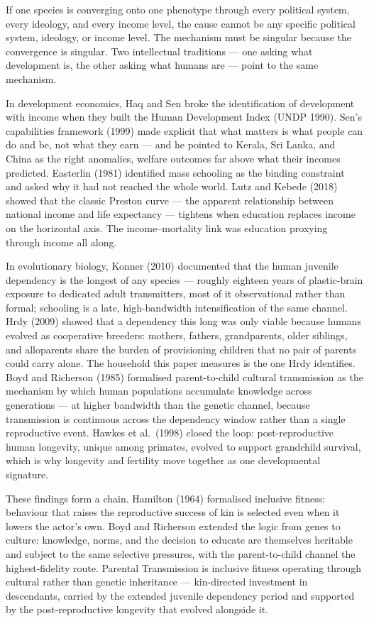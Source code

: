 \documentclass[12pt,letterpaper]{article}
\begin{document}
If one species is converging onto one phenotype through every
political system, every ideology, and every income level, the cause
cannot be any specific political system, ideology, or income level.
The mechanism must be singular because the convergence is singular.
Two intellectual traditions --- one asking what development is, the
other asking what humans are --- point to the same mechanism.

In development economics, Haq and Sen broke the identification of
development with income when they built the Human Development Index
(UNDP 1990). Sen's capabilities framework (1999) made explicit that
what matters is what people can do and be, not what they earn --- and
he pointed to Kerala, Sri Lanka, and China as the right anomalies,
welfare outcomes far above what their incomes predicted. Easterlin
(1981) identified mass schooling as the binding constraint and asked
why it had not reached the whole world. Lutz and Kebede (2018) showed
that the classic Preston curve --- the apparent relationship between
national income and life expectancy --- tightens when education
replaces income on the horizontal axis. The income--mortality link
was education proxying through income all along.

In evolutionary biology, Konner (2010) documented that the human
juvenile dependency is the longest of any species --- roughly
eighteen years of plastic-brain exposure to dedicated adult
transmitters, most of it observational rather than formal; schooling
is a late, high-bandwidth intensification of the same channel. Hrdy
(2009) showed that a dependency this long was only viable because
humans evolved as cooperative breeders: mothers, fathers,
grandparents, older siblings, and alloparents share the burden of
provisioning children that no pair of parents could carry alone. The
household this paper measures is the one Hrdy identifies. Boyd and
Richerson (1985) formalised parent-to-child cultural transmission as
the mechanism by which human populations accumulate knowledge across
generations --- at higher bandwidth than the genetic channel, because
transmission is continuous across the dependency window rather than
a single reproductive event. Hawkes et al.\ (1998) closed the loop:
post-reproductive human longevity, unique among primates, evolved to
support grandchild survival, which is why longevity and fertility
move together as one developmental signature.

These findings form a chain. Hamilton (1964) formalised inclusive
fitness: behaviour that raises the reproductive success of kin is
selected even when it lowers the actor's own. Boyd and Richerson
extended the logic from genes to culture: knowledge, norms, and the
decision to educate are themselves heritable and subject to the same
selective pressures, with the parent-to-child channel the
highest-fidelity route. Parental Transmission is inclusive fitness
operating through cultural rather than genetic inheritance ---
kin-directed investment in descendants, carried by the extended
juvenile dependency period and supported by the post-reproductive
longevity that evolved alongside it.
\end{document}
